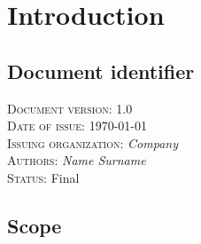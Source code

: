 \chapter{Introduction} \label{chp:introduction}
	\begin{comment}
		Introduce the following subordinate sections. This section identifies the issuing organization and the
		details of issuance. It includes required approvals and status (DRAFT/FINAL) of the document. It is
		here that the scope is described and references identified.
	\end{comment}

\section{Document identifier} \label{s:introduction:document-identifier}
	\begin{comment}
		Uniquely identify a version of the document by including information such as the date of issue, the
		issuing organization, the author(s), the approval signatures (possibly electronic), and the status/version
		(e.g., draft, reviewed, corrected, or final). Identifying information may also include the reviewers and
		pertinent managers. This information is commonly put on an early page in the document, such as the
		cover page or the pages immediately following it. Some organizations put this information at the end
		of the document. This information may also be kept in a place other than in the text of the document
		(e.g., in the configuration management system or in the header or footer of the document).
	\end{comment}
	\textsc{Document version: } 1.0 \\
	\textsc{Date of issue:} \today \\
	\textsc{Issuing organization:} \textit{Company} \\
	\textsc{Authors: } \textit{Name Surname} \\
	\textsc{Status: } Final \\
\section{Scope} \label{s:introduction:scope}
	\begin{comment}
		Identify the test items (software or system) that are the object of testing, e.g., specific attributes of the
		software, the installation instructions, the user instructions, interfacing hardware, database conversion
		software that is not a part of the operational system) including their version/revision level. Also
		identify any procedures for their transfer from other environments to the test environment.
		Supply references to the test item documentation relevant to an individual level of test, if it exists, such
		as follows:
		⎯ Requirements
		⎯ Design
		⎯ User’s guide
		⎯ Operations guide
		⎯ Installation guide
		Reference any Anomaly Reports relating to the test items.
		Identify any items that are to be specifically excluded from testing.
	\end{comment}
	
